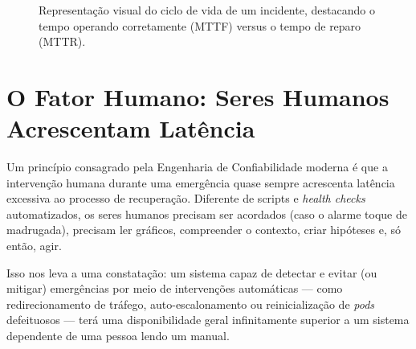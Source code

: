 \documentclass[12pt,a4paper,twoside]{report}
\begin{document}
\begin{figure}[h]
    \centering
    \caption{Representação visual do ciclo de vida de um incidente, destacando o tempo operando corretamente (MTTF) versus o tempo de reparo (MTTR).}
\end{figure}

\section{O Fator Humano: Seres Humanos Acrescentam Latência}

Um princípio consagrado pela Engenharia de Confiabilidade moderna é que a intervenção humana durante uma emergência quase sempre acrescenta latência excessiva ao processo de recuperação. Diferente de scripts e \textit{health checks} automatizados, os seres humanos precisam ser acordados (caso o alarme toque de madrugada), precisam ler gráficos, compreender o contexto, criar hipóteses e, só então, agir.

Isso nos leva a uma constatação: um sistema capaz de detectar e evitar (ou mitigar) emergências por meio de intervenções automáticas — como redirecionamento de tráfego, auto-escalonamento ou reinicialização de \textit{pods} defeituosos — terá uma disponibilidade geral infinitamente superior a um sistema dependente de uma pessoa lendo um manual.
\end{document}
